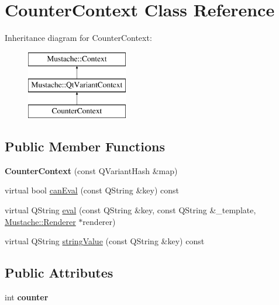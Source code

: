 \hypertarget{classCounterContext}{\section{Counter\+Context Class Reference}
\label{classCounterContext}
}
Inheritance diagram for Counter\+Context\+:\begin{figure}[H]
\begin{center}
\leavevmode
\includegraphics[height=3.000000cm]{db/da6/classCounterContext}
\end{center}
\end{figure}
\subsection*{Public Member Functions}
\begin{DoxyCompactItemize}
\item 
\hypertarget{classCounterContext_a05c70666c806b2cd888c24f5edae8d87}{{\bfseries Counter\+Context} (const Q\+Variant\+Hash \&map)}\label{classCounterContext_a05c70666c806b2cd888c24f5edae8d87}

\item 
virtual bool \hyperlink{classCounterContext_a2b2c8d5bbd329e20ce6e16be72676291}{can\+Eval} (const Q\+String \&key) const 
\item 
virtual Q\+String \hyperlink{classCounterContext_a01764884d5bdbe014b8e569c10c82e99}{eval} (const Q\+String \&key, const Q\+String \&\+\_\+template, \hyperlink{classMustache_1_1Renderer}{Mustache\+::\+Renderer} $\ast$renderer)
\item 
virtual Q\+String \hyperlink{classCounterContext_adb984d696efcc32abaaf0aaeade4f8b8}{string\+Value} (const Q\+String \&key) const 
\end{DoxyCompactItemize}
\subsection*{Public Attributes}
\begin{DoxyCompactItemize}
\item 
\hypertarget{classCounterContext_ac4ad706a0ad4e81fed489f97c5049e03}{int {\bfseries counter}}\label{classCounterContext_ac4ad706a0ad4e81fed489f97c5049e03}

\end{DoxyCompactItemize}
